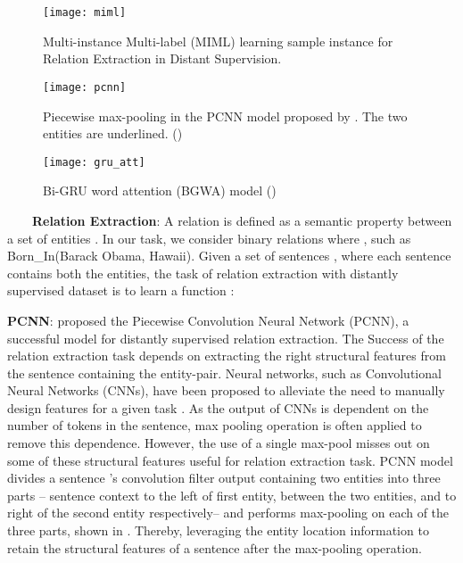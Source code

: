 \documentclass{article}
\begin{document}
\begin{figure}[t]
  \centering
  \setlength{\textfloatsep}{0.42cm}
  \texttt{[image: miml]}
  \caption{\label{fig:miml}Multi-instance Multi-label (MIML) learning sample instance for Relation Extraction in Distant Supervision.}
\end{figure}

\begin{figure}[t]
  \centering
  \setlength{\textfloatsep}{0.30cm}
  \texttt{[image: pcnn]}\caption{Piecewise max-pooling in the PCNN model proposed by \protect\cite{zeng:2015}. The two entities are underlined. ()}
  \label{fig:pcnn}
\end{figure}
\begin{figure}[t]
   \centering
   \setlength{\textfloatsep}{0.30cm}
   \texttt{[image: gru\_att]}
   \caption{\label{gru_att}Bi-GRU word attention (BGWA) model  ()}
\end{figure}~~~~\textbf{Relation Extraction}: A relation is defined as a semantic property between a set of entities . In our task, we consider binary relations where , such as Born\_In(Barack Obama, Hawaii). Given a set of sentences , where each sentence  contains both the entities, the task of relation extraction with distantly supervised dataset is to learn a function :

        
\textbf{PCNN}: \cite{zeng:2015} proposed the Piecewise Convolution Neural Network (PCNN), a successful model for distantly supervised relation extraction. The Success of the relation extraction task depends on extracting the right structural features from the sentence containing the entity-pair. Neural networks, such as Convolutional Neural Networks (CNNs), have been proposed to alleviate the need to manually design features for a given task \cite{zeng:2014}. As the output of  CNNs is dependent on the number of tokens in the sentence, max pooling operation is often applied to remove this dependence. However, the use of a single max-pool misses out on some of these structural features useful for relation extraction task. PCNN model divides a sentence 's convolution filter output  containing two entities into three parts -- sentence context to the left of first entity, between the two entities, and to right of the second entity respectively-- and performs max-pooling on each of the three parts, shown in . Thereby, leveraging the entity location information to retain the structural features of a sentence after the max-pooling operation.
\end{document}

